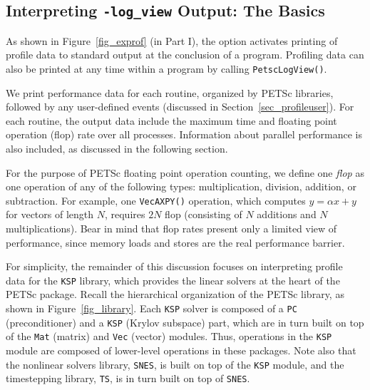 \subsection{Interpreting {\tt -log\_view} Output: The Basics}
\label{sec_ploginfo}

As shown in Figure~\ref{fig_exprof} (in Part I), the option
  activates printing of profile
data to standard output at the conclusion of a program.  Profiling
data can also be printed at any time within a program by calling \lstinline{PetscLogView()}.

We print performance data for each routine, organized by PETSc
libraries, followed by any user-defined events (discussed in
Section~\ref{sec_profileuser}).  For each routine, the output data
include the maximum time and floating point operation (flop) rate over
all processes.  Information about parallel performance is also
included, as discussed in the following section.

For the purpose of PETSc floating point operation counting, we define
one {\em flop} as one operation of any of the following types:
multiplication, division, addition, or subtraction.  For example, one
\lstinline{VecAXPY()} operation, which computes $y = \alpha x + y$ for
vectors of length $N$, requires $2N$ flop (consisting of $N$
additions and $N$ multiplications).  Bear in mind that flop rates
present only a limited view of performance, since memory loads and stores are
the real performance barrier.

For simplicity, the remainder of this discussion focuses on
interpreting profile data for the \lstinline{KSP} library,
which provides the linear solvers at the heart of the
PETSc package.  Recall the hierarchical organization of the PETSc
library, as shown in Figure~\ref{fig_library}.  Each \lstinline{KSP} solver
is composed of a \lstinline{PC} (preconditioner) and a \lstinline{KSP} (Krylov
subspace) part, which are in turn built on top of the \lstinline{Mat}
(matrix) and \lstinline{Vec} (vector) modules.  Thus, operations in the
\lstinline{KSP} module are composed of lower-level operations in these
packages.  Note also that the nonlinear solvers library, \lstinline{SNES},
is built on top of the \lstinline{KSP} module, and the timestepping
library, \lstinline{TS}, is in turn built on top of \lstinline{SNES}.


